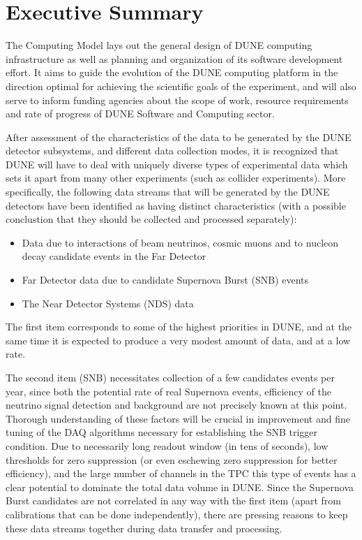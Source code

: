 \section{Executive Summary}
The Computing Model lays out the general design of DUNE computing infrastructure as well as planning and
organization of its software development effort. It aims to guide the evolution of the DUNE computing
platform in the direction optimal for achieving the scientific goals of the experiment, and will also serve
to inform funding agencies about the scope of work, resource requirements and rate of progress of 
DUNE Software and Computing sector.

After assessment of the characteristics of the data to be generated by the DUNE detector subsystems,
and different data collection modes, it is recognized that DUNE will have to deal with uniquely diverse
types of experimental data which sets it apart from many other experiments (such as collider experiments). More specifically,
the following data streams that will be generated by the DUNE detectors have been identified as having distinct characteristics
(with a possible conclustion that they should be collected and processed separately):

\begin{itemize}

\item Data due to interactions of beam neutrinos, cosmic muons and to nucleon decay candidate events in the Far Detector

\item Far Detector data due to candidate Supernova Burst (SNB) events

\item The Near Detector Systems (NDS) data

\end{itemize}

The first item corresponds to some of the highest priorities in DUNE, and at the same time it is expected to produce
a very modest amount of data, and at a low rate.

The second item (SNB) necessitates collection of a few candidates
events per year, since both the potential rate of real Supernova events, efficiency of the neutrino signal detection
and background are not precisely known at this point. Thorough understanding of these factors will be crucial
in improvement and fine tuning of the DAQ algorithms necessary for establishing the SNB trigger condition.
Due to necessarily long readout window (in tens of seconds), low thresholds for zero suppression (or even
eschewing zero suppression for better efficiency), and the large number of channels in the TPC this type of events
has a clear potential to dominate the total data volume in DUNE. Since the Supernova Burst candidates are not correlated
in any way with the first item (apart from calibrations that can be done independently), there are pressing reasons to keep
these data streams together during data transfer and processing.

